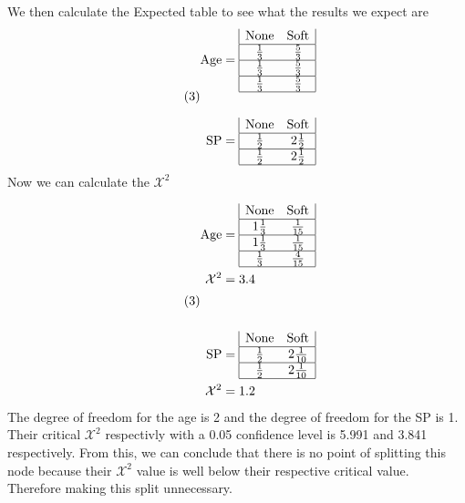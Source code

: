 \documentclass[12pt,english]{article}
\begin{document}
We then calculate the Expected table to see what the results we expect are
\begin{equation}\tag{3}\label{eq:7}
\begin{split}
\mbox{Age} &= 
\begin{array}{|cc|}
 \mbox{None} & \mbox{Soft}\\
\hline
 \frac{1}{3} & \frac{5}{3}\\
\hline
 \frac{1}{3} & \frac{5}{3}\\
\hline
 \frac{1}{3} & \frac{5}{3}\\
\hline
\end{array}
\\
\\
\mbox{SP} &= 
\begin{array}{|cc|}
 \mbox{None} & \mbox{Soft}\\
\hline
 \frac{1}{2} & 2\frac{1}{2}\\
\hline
 \frac{1}{2} & 2\frac{1}{2}\\
\hline
\end{array}
\end{split}
\end{equation}
Now we can calculate the $\mathcal{X}^2$

\begin{equation}\tag{3}\label{eq:7}
\begin{split}
\mbox{Age} &= 
\begin{array}{|cc|}
 \mbox{None} & \mbox{Soft}\\
\hline
1\frac{1}{3} & \frac{1}{15}\\
\hline
 1\frac{1}{3} & \frac{1}{15}\\
\hline
 \frac{1}{3} & \frac{4}{15}\\
\hline
\end{array}
\\
\mathcal{X}^2 &= 3.4\\
\\
\\
\mbox{SP} &= 
\begin{array}{|cc|}
 \mbox{None} & \mbox{Soft}\\
\hline
 \frac{1}{2} & 2\frac{1}{10}\\
\hline
 \frac{1}{2} & 2\frac{1}{10}\\
\hline
\end{array}
\\
\mathcal{X}^2 &=1.2
\end{split}
\end{equation}
The degree of freedom for the age is 2 and the degree of freedom for the SP is 1. Their critical $\mathcal{X}^2$ respectivly with a 0.05 confidence level is 5.991 and 3.841 respectively. From this, we can conclude that there is no point of splitting this node because their $\mathcal{X}^2$ value is well below their respective critical value. Therefore making this split unnecessary.
\end{document}
